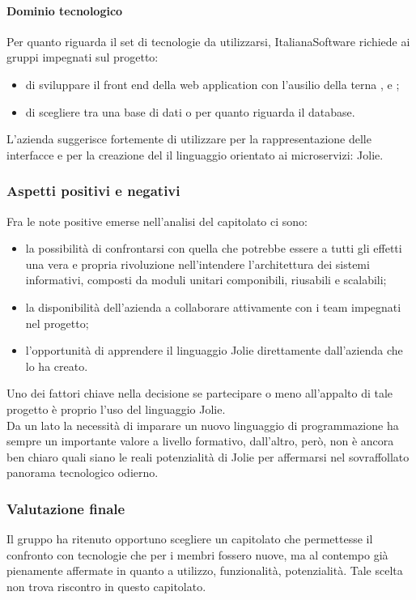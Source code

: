 			\paragraph{Dominio tecnologico}
			Per quanto riguarda il set di tecnologie da utilizzarsi, ItalianaSoftware richiede ai gruppi impegnati sul progetto:
			\begin{itemize}
			\item di sviluppare il front end della web application con l'ausilio della terna ,  e ;
			\item di scegliere tra una base di dati  o  per quanto riguarda il database.\\
			\end{itemize}
			L'azienda suggerisce fortemente di utilizzare per la rappresentazione delle interfacce e per la creazione del 
			il linguaggio orientato ai microservizi: Jolie.
		\subsubsection{Aspetti positivi e negativi}
		Fra le note positive emerse nell'analisi del capitolato ci sono:
		\begin{itemize}
			\item la possibilità di confrontarsi con quella che potrebbe essere a tutti gli effetti una vera e propria rivoluzione nell'intendere 
			l'architettura dei sistemi informativi, composti da moduli unitari componibili, riusabili e scalabili;
			\item la disponibilità dell'azienda a collaborare attivamente con i team impegnati nel progetto;
			\item l'opportunità di apprendere il linguaggio Jolie direttamente dall'azienda che lo ha creato.
		\end{itemize}
		Uno dei fattori chiave nella decisione se partecipare o meno all'appalto di tale progetto è proprio l'uso del linguaggio Jolie.
		\\Da un lato la necessità di imparare un nuovo linguaggio di programmazione ha sempre un importante valore a livello formativo, dall'altro, 
		però, non è ancora ben chiaro quali siano le reali potenzialità di Jolie per affermarsi nel sovraffollato panorama tecnologico odierno.
		\subsubsection{Valutazione finale}
		Il gruppo \hx{} ha ritenuto opportuno scegliere un capitolato che permettesse il confronto con tecnologie che per i membri fossero nuove,
		ma al contempo già pienamente affermate in quanto a utilizzo, funzionalità, potenzialità. Tale scelta non trova riscontro in questo capitolato.
		
